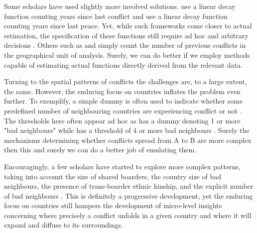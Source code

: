 \documentclass[a4paper]{article}
\begin{document}
Some scholars have used slightly more involved solutions. \cite{Collier_Hoeffler_2004} use a linear decay function counting years since last conflict and \cite{Hegre_Sambanis_2006} use a linear decay function counting years since last peace. Yet, while such frameworks come closer to actual estimation, the specification of these functions still require ad hoc and arbitrary decisions \cite[501]{Gelman_2013}. Others such as \cite{Cederman_Gleditsch_Buhaug_2013} and \cite{Maase} simply count the number of previous conflicts in the geographical unit of analysis. Surely, we can do better if we employ methods capable of estimating actual functions directly derived from the relevant data.\par

Turning to the spatial patterns of conflicts the challenges are, to a large extent, the same. However, the enduring focus on countries inflates the problem even further. To exemplify, a simple dummy is often used to indicate whether some predefined number of neighbouring countries are experiencing conflict or not \citep{Hegre_Sambanis_2006, Goldstone_2010}. The thresholds here often appear ad hoc as \cite{Hegre_Sambanis_2006} has a dummy denoting 1 or more "bad neighbours" \citep[521-522]{Hegre_Sambanis_2006} while \cite{Goldstone_2010} has a threshold of 4 or more bad neighbours \citep[197]{Goldstone_2010}. Surely the mechanisms determining whether conflicts spread from A to B are more complex then this and surely we can do a better job of emulating them.\par 

Encouragingly, a few scholars have started to explore more complex patterns, taking into account the size of shared boarders, the country size of bad neighbours, the presence of trans-boarder ethnic kinship, and the explicit number of bad neighbours \citep{buhaug2008contagion, Cederman_Gleditsch_Buhaug_2013, bara_2017}. This is definitely a progressive development, yet the enduring focus on countries still hampers the development of micro-level insights concerning where precisely a conflict unfolds in a given country and where it will expand and diffuse to its surroundings.\par
\end{document}
